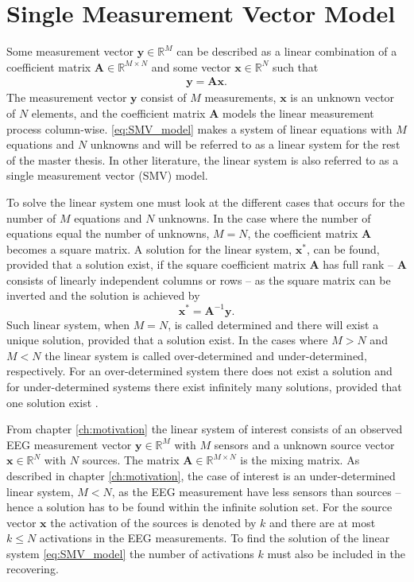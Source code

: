 \section{Single Measurement Vector Model}\label{sec:SMV}
Some measurement vector $\mathbf{y} \in \mathbb{R}^M$ can be described as a linear combination of a coefficient matrix $\mathbf{A} \in \mathbb{R}^{M \times N}$ and some vector $\mathbf{x} \in \mathbb{R}^N$ such that
\begin{align}\label{eq:SMV_model}
\mathbf{y} = \mathbf{Ax}.
\end{align}
The measurement vector $\mathbf{y}$ consist of $M$ measurements, $\mathbf{x}$ is an unknown vector of $N$ elements, and the coefficient matrix $\mathbf{A}$ models the linear measurement process column-wise. 
\ref{eq:SMV_model} makes a system of linear equations with $M$ equations and $N$ unknowns and will be referred to as a linear system for the rest of the master thesis. In other literature, the linear system is also referred to as a single measurement vector (SMV) model.

To solve the linear system one must look at the different cases that occurs for the number of $M$ equations and $N$ unknowns.
In the case where the number of equations equal the number of unknowns, $M = N$, the coefficient matrix $\mathbf{A}$ becomes a square matrix. 
A solution for the linear system, $\mathbf{x}^\ast$, can be found, provided that a solution exist, if the square coefficient matrix $\mathbf{A}$ has full rank -- $\mathbf{A}$ consists of linearly independent columns or rows -- as the square matrix can be inverted and the solution is achieved by 
$$
\mathbf{x}^\ast = \mathbf{A}^{-1} \mathbf{y}.
$$
Such linear system, when $M = N$, is called determined and there will exist a unique solution, provided that a solution exist. 
In the cases where $M > N$ and $M < N$ the linear system is called over-determined and under-determined, respectively. 
For an over-determined system there does not exist a solution and for under-determined systems there exist infinitely many solutions, provided that one solution exist \cite[p. ix]{CS} .

From chapter \ref{ch:motivation} the linear system of interest consists of an observed EEG measurement vector $\mathbf{y} \in \mathbb{R}^M$ with $M$ sensors and a unknown source vector $\mathbf{x} \in \mathbb{R}^N$ with $N$ sources. 
The matrix $\mathbf{A} \in \mathbb{R}^{M \times N}$ is the mixing matrix.
As described in chapter \ref{ch:motivation}, the case of interest is an under-determined linear system, $M < N$, as the EEG measurement have less sensors than sources -- hence a solution has to be found within the infinite solution set. 
For the source vector $\mathbf{x}$ the activation of the sources is denoted by $k$ and there are at most $k \leq N$ activations in the EEG measurements. 
To find the solution of the linear system \eqref{eq:SMV_model} the number of activations $k$ must also be included in the recovering.


